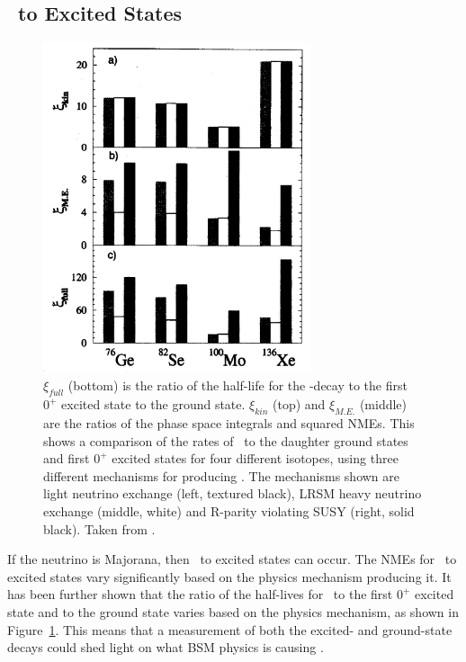 \documentclass[/main.tex]{subfiles}
\begin{document}
\subsection{\znbb\ to Excited States}
\begin{figure}[t]
  \centering
  \includegraphics[width=0.7\textwidth]{esmechanismratio}
  \caption[\znbb\ to excited states for different \znbb\ mechanisms]{\label{fig:esmechanism}
    $\xi_{full}$ (bottom) is the ratio of the half-life for the \bb-decay to the first $0^+$ excited state to the ground state. $\xi_{kin}$ (top) and $\xi_{M.E.}$ (middle) are the ratios of the phase space integrals and squared NMEs. This shows a comparison of the rates of \znbb\ to the daughter ground states and first $0^+$ excited states for four different isotopes, using three different mechanisms for producing \znbb. The mechanisms shown are light neutrino exchange (left, textured black), LRSM heavy neutrino exchange (middle, white) and R-parity violating SUSY (right, solid black). Taken from \cite{Simkovic2002}.
  }
\end{figure}
If the neutrino is Majorana, then \znbb\ to excited states can occur.
The NMEs for \znbb\ to excited states vary significantly based on the physics mechanism producing it.
It has been further shown that the ratio of the half-lives for \znbb\ to the first $0^+$ excited state and to the ground state varies based on the physics mechanism, as shown in Figure~\ref{fig:esmechanism}\cite{Simkovic2002, Suhonen2016}.
This means that a measurement of both the excited- and ground-state decays could shed light on what BSM physics is causing \znbb.
\end{document}
